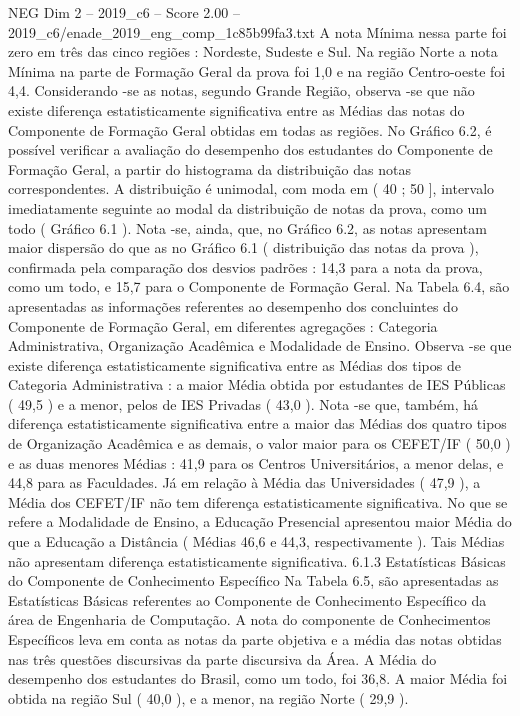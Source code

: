 \begin{textsample}{NEG Dim 2 – 2019\_c6 – Score 2.00 – 2019\_c6/enade\_2019\_eng\_comp\_1c85b99fa3.txt}
A nota Mínima nessa parte foi zero em três das cinco regiões : Nordeste, Sudeste e Sul.
Na região Norte a nota Mínima na parte de Formação Geral da prova foi 1,0 e na região Centro-oeste foi 4,4.
Considerando -se as notas, segundo Grande Região, observa -se que não existe diferença estatisticamente significativa entre as Médias das notas do Componente de Formação Geral obtidas em todas as regiões.
No Gráfico 6.2, é possível verificar a avaliação do desempenho dos estudantes do Componente de Formação Geral, a partir do histograma da distribuição das notas correspondentes.
A distribuição é unimodal, com moda em ( 40 ; 50 ], intervalo imediatamente seguinte ao modal da distribuição de notas da prova, como um todo ( Gráfico 6.1 ).
Nota -se, ainda, que, no Gráfico 6.2, as notas apresentam maior dispersão do que as no Gráfico 6.1 ( distribuição das notas da prova ), confirmada pela comparação dos desvios padrões : 14,3 para a nota da prova, como um todo, e 15,7 para o Componente de Formação Geral.
Na Tabela 6.4, são apresentadas as informações referentes ao desempenho dos concluintes do Componente de Formação Geral, em diferentes agregações : Categoria Administrativa, Organização Acadêmica e Modalidade de Ensino.
Observa -se que existe diferença estatisticamente significativa entre as Médias dos tipos de Categoria Administrativa : a maior Média obtida por estudantes de IES Públicas ( 49,5 ) e a menor, pelos de IES Privadas ( 43,0 ).
Nota -se que, também, há diferença estatisticamente significativa entre a maior das Médias dos quatro tipos de Organização Acadêmica e as demais, o valor maior para os CEFET/IF ( 50,0 ) e as duas menores Médias : 41,9 para os Centros Universitários, a menor delas, e 44,8 para as Faculdades.
Já em relação à Média das Universidades ( 47,9 ), a Média dos CEFET/IF não tem diferença estatisticamente significativa.
No que se refere a Modalidade de Ensino, a Educação Presencial apresentou maior Média do que a Educação a Distância ( Médias 46,6 e 44,3, respectivamente ).
Tais Médias não apresentam diferença estatisticamente significativa. 6.1.3 Estatísticas Básicas do Componente de Conhecimento Específico Na Tabela 6.5, são apresentadas as Estatísticas Básicas referentes ao Componente de Conhecimento Específico da área de Engenharia de Computação.
A nota do componente de Conhecimentos Específicos leva em conta as notas da parte objetiva e a média das notas obtidas nas três questões discursivas da parte discursiva da Área.
A Média do desempenho dos estudantes do Brasil, como um todo, foi 36,8.
A maior Média foi obtida na região Sul ( 40,0 ), e a menor, na região Norte ( 29,9 ).

\end{textsample}
